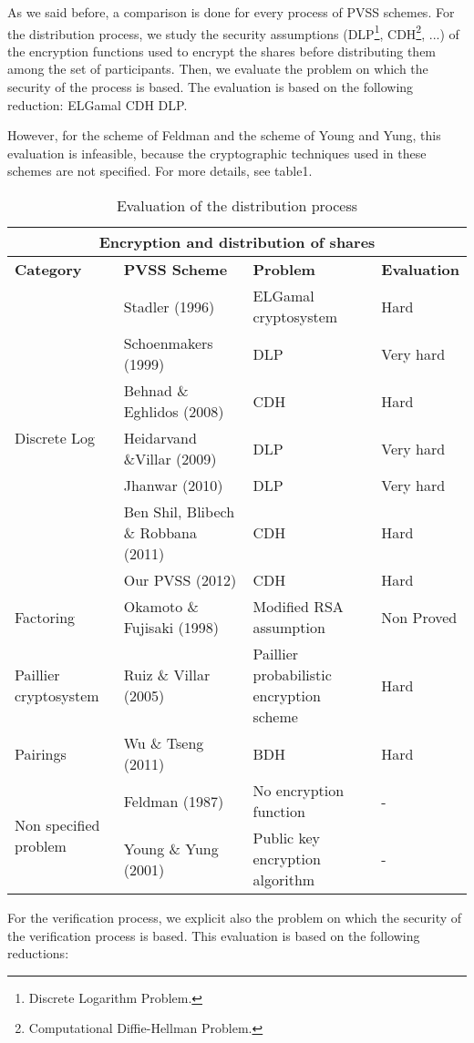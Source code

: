\documentclass[submission,copyright,creativecommons]{eptcs}
\begin{document}
As we said before, a comparison is done for every process of PVSS
schemes. For the distribution process, we study the security assumptions (DLP\footnote{Discrete Logarithm Problem.}, CDH\footnote{Computational Diffie-Hellman Problem.}, ...) of the encryption functions
used to encrypt the shares before distributing them among the set of
participants. Then, we evaluate the problem on which the security of the
process is based. The evaluation is based on the following reduction:
ELGamal  CDH  DLP.

However, for the scheme of Feldman and the scheme of Young and Yung, this
evaluation is infeasible, because the cryptographic techniques used in these
schemes are not specified. For more details, see table1.

\begin{table*}[h] \centering \begin{tabular}{|p{3cm}||p{4cm}||p{2.5cm}||p{2.5cm}|}
\hline
\multicolumn{4}{|c|}{\textbf{Encryption and distribution of shares}} \\ 
\hline
\textbf{Category} & \textbf{PVSS Scheme} & \textbf{Problem} & \textbf{Evaluation} \\ \hline
\multirow{7}{*}{Discrete Log} & Stadler (1996) & ELGamal cryptosystem & Hard \\ 
\cline{2-4}
& Schoenmakers (1999) & DLP & Very hard \\ \cline{2-4}
& Behnad \& Eghlidos (2008) & CDH & Hard \\ \cline{2-4}
& Heidarvand \&Villar (2009) & DLP & Very hard \\ \cline{2-4}
& Jhanwar (2010) & DLP & Very hard \\ \cline{2-4}
& Ben Shil, Blibech \& Robbana (2011) & CDH & Hard \\ \cline{2-4}
& Our PVSS (2012) & CDH & Hard \\ \hline
\multirow{1}{*}{Factoring} & Okamoto \& Fujisaki (1998) & Modified RSA assumption
& Non Proved \\ \hline
Paillier cryptosystem & Ruiz \& Villar (2005) & Paillier
probabilistic encryption scheme & Hard \\ \hline
\multirow{1}{*}{Pairings} & Wu \& Tseng (2011) & BDH & Hard \\ \hline
\multirow{2}{3cm}{Non specified problem} & Feldman (1987) & No encryption function & 
- \\ \cline{2-4}
& Young \& Yung (2001) & Public key encryption algorithm & - \\ \hline
\end{tabular}\caption{Evaluation of the distribution process}\label{Evaluation of the
distribution process}\end{table*}For the verification process, we explicit also the problem on which the
security of the verification process is based. This evaluation is based on
the following reductions:
\end{document}
